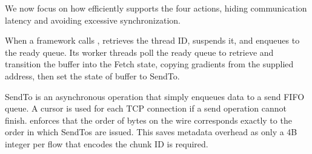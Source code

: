 




We now focus on how \ha efficiently supports the four actions, hiding communication latency and avoiding excessive synchronization.

When a framework calls , \ha retrieves the thread ID, suspends it, and enqueues  to the ready queue. Its worker threads poll the ready queue to retrieve  and transition the buffer into the Fetch state, copying gradients from the supplied address, then set the state of buffer to SendTo. %

SendTo is an asynchronous operation that simply enqueues data to a send FIFO queue. A cursor is used for each TCP connection if a send operation cannot finish. \ha enforces that the order of bytes on the wire corresponds exactly to the order in which SendTos are issued. This saves metadata overhead as only a 4B integer per flow that encodes the chunk ID is required.


